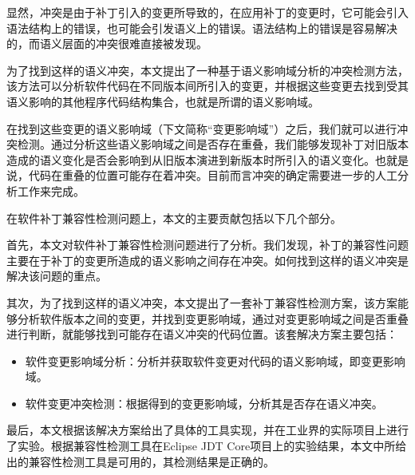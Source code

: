 显然，冲突是由于补丁引入的变更所导致的，在应用补丁的变更时，它可能会引入语法结构上的错误，也可能会引发语义上的错误。语法结构上的错误是容易解决的，而语义层面的冲突很难直接被发现。

为了找到这样的语义冲突，本文提出了一种基于语义影响域分析的冲突检测方法，该方法可以分析软件代码在不同版本间所引入的变更，并根据这些变更去找到受其语义影响的其他程序代码结构集合，也就是所谓的语义影响域。

在找到这些变更的语义影响域（下文简称“变更影响域”）之后，我们就可以进行冲突检测。通过分析这些语义影响域之间是否存在重叠，我们能够发现补丁对旧版本造成的语义变化是否会影响到从旧版本演进到新版本时所引入的语义变化。也就是说，代码在重叠的位置可能存在着冲突。目前而言冲突的确定需要进一步的人工分析工作来完成。

在软件补丁兼容性检测问题上，本文的主要贡献包括以下几个部分。

首先，本文对软件补丁兼容性检测问题进行了分析。我们发现，补丁的兼容性问题主要在于补丁的变更所造成的语义影响之间存在冲突。如何找到这样的语义冲突是解决该问题的重点。

其次，为了找到这样的语义冲突，本文提出了一套补丁兼容性检测方案，该方案能够分析软件版本之间的变更，并找到变更影响域，通过对变更影响域之间是否重叠进行判断，就能够找到可能存在语义冲突的代码位置。该套解决方案主要包括：
	\begin{itemize}
		\item 软件变更影响域分析：分析并获取软件变更对代码的语义影响域，即变更影响域。
		\item 软件变更冲突检测：根据得到的变更影响域，分析其是否存在语义冲突。
	\end{itemize}
	
最后，本文根据该解决方案给出了具体的工具实现，并在工业界的实际项目上进行了实验。根据兼容性检测工具在Eclipse JDT Core项目上的实验结果，本文中所给出的兼容性检测工具是可用的，其检测结果是正确的。



